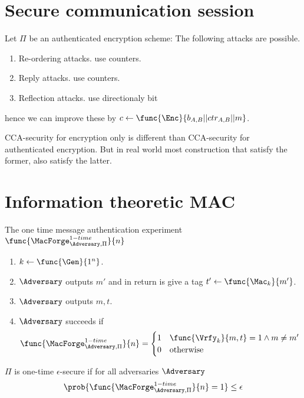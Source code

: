 \section{Secure communication session}
Let \(\Pi\) be an authenticated encryption scheme: The following attacks are possible.
\begin{enumerate}
    \item Re-ordering attacks. use counters.
    \item Reply attacks. use counters.
    \item Reflection attacks. use directionaly bit
\end{enumerate}
hence we can improve these by \(c \gets \func{\Enc}{b_{A,B} || ctr_{A,B} || m }\).

\begin{remark}
    CCA-security for encryption only is different than CCA-security for authenticated encryption. But in real world most construction that satisfy the former, also satisfy the latter.
\end{remark}

\section{Information theoretic MAC}
The one time message authentication experiment \(\func{\MacForge_{\Adversary,\Pi}^{1-time}}{n}\)
\begin{enumerate}
    \item \(k \gets \func{\Gen}{1^n}\).
    \item \(\Adversary\) outputs \(m'\) and in return is give a tag \(t' \gets \func{\Mac_k}{m'}\).
    \item \(\Adversary\) outputs \(m,t\).
    \item \(\Adversary\) succeeds if 
    \begin{equation*}
        \func{\MacForge_{\Adversary,\Pi}^{1-time}}{n} = \begin{cases}
            1 & \func{\Vrfy_k}{m,t} = 1 \land m \neq m' \\
            0 & \text{otherwise}
        \end{cases}
    \end{equation*}
\end{enumerate}

\begin{definition}
    \(\Pi\) is one-time \(\epsilon\)-secure if for all adversaries \(\Adversary\)
    \begin{equation*}
        \prob{\func{\MacForge_{\Adversary,\Pi}^{1-time}}{n} = 1} \leq \epsilon
    \end{equation*}
\end{definition}
